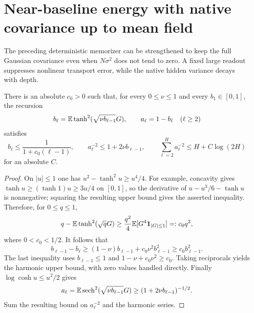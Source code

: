 \section{Near-baseline energy with native covariance up to mean field}
\label{sec:native-near-baseline}
The preceding deterministic memorizer can be strengthened to keep the full Gaussian covariance even when $N\sigma^2$ does not tend to zero. A fixed large readout suppresses nonlinear transport error, while the native hidden variance decays with depth.

\begin{lemma}
\label{lem:native-variance-decay}
There is an absolute $c_0>0$ such that, for every $0\le\nu\le1$ and every $b_1\in[0,1]$, the recursion
\[
 b_\ell=\mathbb E\tanh^2(\sqrt{\nu b_{\ell-1}}G),\qquad
 a_\ell=1-b_\ell\quad(\ell\ge2)
\]
satisfies
\[
 b_\ell\le\frac1{1+c_0(\ell-1)},\qquad
 a_\ell^{-2}\le1+2\nu b_{\ell-1},\qquad
 \sum_{\ell=2}^H a_\ell^{-2}\le H+C\log(2H)
\]
for an absolute $C$.
\end{lemma}
\begin{proof}
On $|u|\le1$ one has $u^2-\tanh^2u\ge u^4/4$. For example, concavity gives $\tanh u\ge(\tanh1)u\ge3u/4$ on $[0,1]$, so the derivative of $u-u^3/6-\tanh u$ is nonnegative; squaring the resulting upper bound gives the asserted inequality. Therefore, for $0\le q\le1$,
\[
 q-\mathbb E\tanh^2(\sqrt qG)\ge
 \frac{q^2}4\mathbb E[G^4\mathbf1_{|G|\le1}]=:c_0q^2,
\]
where $0<c_0<1/2$. It follows that
\[
 b_{\ell-1}-b_\ell
 \ge(1-\nu)b_{\ell-1}+c_0\nu^2 b_{\ell-1}^2
 \ge c_0b_{\ell-1}^2.
\]
The last inequality uses $b_{\ell-1}\le1$ and $1-\nu+c_0\nu^2\ge c_0$. Taking reciprocals yields the harmonic upper bound, with zero values handled directly. Finally $\log\cosh u\le u^2/2$ gives
\[
 a_\ell=\mathbb E\operatorname{sech}^2(\sqrt{\nu b_{\ell-1}}G)
 \ge(1+2\nu b_{\ell-1})^{-1/2}.
\]
Sum the resulting bound on $a_\ell^{-2}$ and the harmonic series.
\end{proof}

